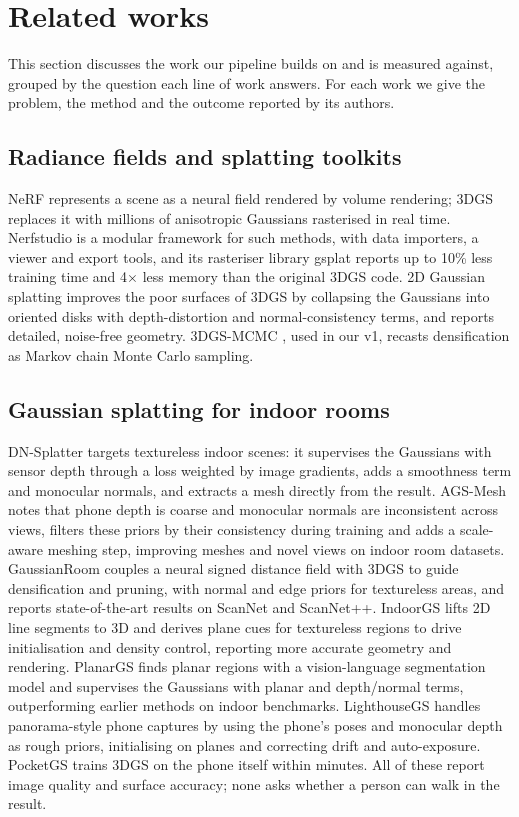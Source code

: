 \section{Related works}
\label{sec:related}

This section discusses the work our pipeline builds on and is measured against, grouped by the question each line of work answers. For each work we give the problem, the method and the outcome reported by its authors.

\subsection{Radiance fields and splatting toolkits}
NeRF \cite{mildenhall2020nerf} represents a scene as a neural field rendered by volume rendering; 3DGS \cite{kerbl3dgs} replaces it with millions of anisotropic Gaussians rasterised in real time. Nerfstudio \cite{tancik2023nerfstudio} is a modular framework for such methods, with data importers, a viewer and export tools, and its rasteriser library gsplat \cite{ye2025gsplat} reports up to 10\% less training time and 4$\times$ less memory than the original 3DGS code. 2D Gaussian splatting \cite{huang2024twodgs} improves the poor surfaces of 3DGS by collapsing the Gaussians into oriented disks with depth-distortion and normal-consistency terms, and reports detailed, noise-free geometry. 3DGS-MCMC \cite{kheradmand2024mcmc}, used in our v1, recasts densification as Markov chain Monte Carlo sampling.

\subsection{Gaussian splatting for indoor rooms}
DN-Splatter \cite{turkulainen2025dnsplatter} targets textureless indoor scenes: it supervises the Gaussians with sensor depth through a loss weighted by image gradients, adds a smoothness term and monocular normals, and extracts a mesh directly from the result. AGS-Mesh \cite{ren2025agsmesh} notes that phone depth is coarse and monocular normals are inconsistent across views, filters these priors by their consistency during training and adds a scale-aware meshing step, improving meshes and novel views on indoor room datasets. GaussianRoom \cite{xiang2025gaussianroom} couples a neural signed distance field with 3DGS to guide densification and pruning, with normal and edge priors for textureless areas, and reports state-of-the-art results on ScanNet and ScanNet++. IndoorGS \cite{ruan2025indoorgs} lifts 2D line segments to 3D and derives plane cues for textureless regions to drive initialisation and density control, reporting more accurate geometry and rendering. PlanarGS \cite{jin2025planargs} finds planar regions with a vision-language segmentation model and supervises the Gaussians with planar and depth/normal terms, outperforming earlier methods on indoor benchmarks. LighthouseGS \cite{han2026lighthousegs} handles panorama-style phone captures by using the phone's poses and monocular depth as rough priors, initialising on planes and correcting drift and auto-exposure. PocketGS \cite{guo2026pocketgs} trains 3DGS on the phone itself within minutes. All of these report image quality and surface accuracy; none asks whether a person can walk in the result.

